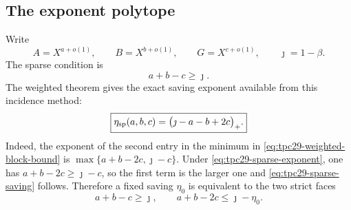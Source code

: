 \subsection{The exponent polytope}

Write
\begin{equation}
 A=X^{a+o(1)},\qquad
 B=X^{b+o(1)},\qquad
 G=X^{c+o(1)},\qquad
 \jmath=1-\beta.
 \label{eq:tpc29-block-exponents}
\end{equation}
The sparse condition is
\begin{equation}
 a+b-c\ge\jmath.
 \label{eq:tpc29-sparse-exponent}
\end{equation}
The weighted theorem gives the exact saving exponent available from
this incidence method:
\begin{equation}
 \boxed{
 \eta_{\rm sp}(a,b,c)
 =\bigl(\jmath-a-b+2c\bigr)_+.}
 \label{eq:tpc29-sparse-saving}
\end{equation}
Indeed, the exponent of the second entry in the minimum in
\eqref{eq:tpc29-weighted-block-bound} is
$\max\{a+b-2c,\jmath-c\}$.  Under
\eqref{eq:tpc29-sparse-exponent}, one has
$a+b-2c\ge\jmath-c$, so the first term is the larger one and
\eqref{eq:tpc29-sparse-saving} follows.  Therefore a fixed saving
$\eta_0$ is equivalent to the two strict faces
\begin{equation}
 a+b-c\ge\jmath,
 \qquad
 a+b-2c\le\jmath-\eta_0.
 \label{eq:tpc29-rich-polytope}
\end{equation}
